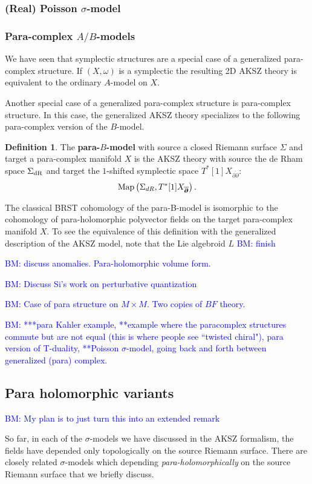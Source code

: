 \documentclass{article}
\newcommand{\p}{\partial}
\newcommand{\pd}{\overline{\p\!\!\!\p}}
\theoremstyle{definition}
\newtheorem{Def}[theorem]{Definition}
\theoremstyle{remark}
\def\brian{\textcolor{blue}{BM: }\textcolor{blue}}
\begin{document}
\subsubsection*{(Real) Poisson $\sigma$-model}



\subsubsection*{Para-complex $A/B$-models}

We have seen that symplectic structures are a special case of a generalized para-complex structure. 
If $(X, \omega)$ is a symplectic the resulting 2D AKSZ theory is equivalent to the ordinary $A$-model on $X$. 

Another special case of a generalized para-complex structure is para-complex structure.
In this case, the generalized AKSZ theory specializes to the following para-complex version of the $B$-model.

\begin{Def}
The {\bf para-$B$-model} with source a closed Riemann surface $\Sigma$ and target a para-complex manifold $X$ is the AKSZ theory with source the de Rham space $\Sigma_{\rm dR}$ and target the $1$-shifted symplectic space $T^*[1] X_{\pd}$:
\[
{\rm Map}\left(\Sigma_{dR}, T^*[1]  X_{\pd}\right) .
\]
\end{Def}

The classical BRST cohomology of the para-B-model is isomorphic to the cohomology of para-holomorphic polyvector fields on the target para-complex manifold $X$.
To see the equivalence of this definition with the generalized description of the AKSZ model, note that the Lie algebroid $L$ \brian{finish}
 
\brian{discuss anomalies. Para-holomorphic volume form.}

\brian{Discuss Si's work on perturbative quantization}

\brian{Case of para structure on $M \times M$. Two copies of $BF$ theory.}

\hrulefill

\brian{***para Kahler example, **example where the paracomplex structures commute but are not equal (this is where people see ``twisted chiral"), para version of T-duality, **Poisson $\sigma$-model, going back and forth between generalized (para) complex.
}  

\subsection{Para holomorphic variants}

\brian{My plan is to just turn this into an extended remark}

So far, in each of the $\sigma$-models we have discussed in the AKSZ formalism, the fields have depended only topologically on the source Riemann surface. 
There are closely related $\sigma$-models which depending {\em para-holomorphically} on the source Riemann surface that we briefly discuss. 



\end{document}
